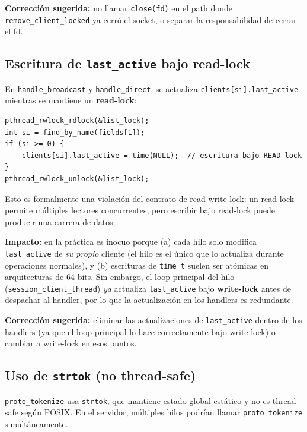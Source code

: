 \documentclass[12pt,a4paper]{article}
\begin{document}
\textbf{Corrección sugerida:} no llamar \texttt{close(fd)} en el path donde
\texttt{remove\_client\_locked} ya cerró el socket, o separar la responsabilidad de
cerrar el fd.

\subsection{Escritura de \texttt{last\_active} bajo read-lock}

En \texttt{handle\_broadcast} y \texttt{handle\_direct}, se actualiza
\texttt{clients[si].last\_active} mientras se mantiene un \textbf{read-lock}:

\begin{lstlisting}[caption={Escritura bajo read-lock en handle\_broadcast}]
pthread_rwlock_rdlock(&list_lock);
int si = find_by_name(fields[1]);
if (si >= 0) {
    clients[si].last_active = time(NULL);  // escritura bajo READ-lock
}
pthread_rwlock_unlock(&list_lock);
\end{lstlisting}

Esto es formalmente una violación del contrato de read-write lock: un read-lock
permite múltiples lectores concurrentes, pero escribir bajo read-lock puede producir
una carrera de datos.

\textbf{Impacto:} en la práctica es inocuo porque (a) cada hilo solo modifica
\texttt{last\_active} de \textit{su propio} cliente (el hilo es el único que lo
actualiza durante operaciones normales), y (b) escrituras de \texttt{time\_t} suelen
ser atómicas en arquitecturas de 64 bits.  Sin embargo, el loop principal del hilo
(\texttt{session\_client\_thread}) \textit{ya} actualiza \texttt{last\_active} bajo
\textbf{write-lock} antes de despachar al handler, por lo que la actualización en
los handlers es redundante.

\textbf{Corrección sugerida:} eliminar las actualizaciones de \texttt{last\_active}
dentro de los handlers (ya que el loop principal lo hace correctamente bajo
write-lock) o cambiar a write-lock en esos puntos.

\subsection{Uso de \texttt{strtok} (no thread-safe)}

\texttt{proto\_tokenize} usa \texttt{strtok}, que mantiene estado global estático y
no es thread-safe según POSIX.  En el servidor, múltiples hilos podrían llamar
\texttt{proto\_tokenize} simultáneamente.
\end{document}
